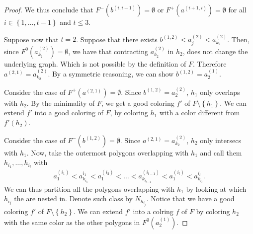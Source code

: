 \documentclass[12pt]{article}
\theoremstyle{definition}
\begin{document}
\begin{proof}
         We thus conclude that
         $F^{-}\left(b^{\left(i, i+1\right)}\right) = \emptyset$ 
         or $F^{+}\left(a^{\left(i+1, i\right)}\right) = \emptyset$
         for all
         $i \in \left\{1, \ldots, t-1\right\}$ and
         $t \leq 3$.

         Suppose now that $t = 2$.
         Suppose that there exists
         $b^{\left(1,2\right)} < 
         a_{j}^{\left(2\right)} <
         a_{k_2}^{\left(2\right)}$.
         Then, since $F^{0}\left(a_{k_2}^{\left(2\right)}\right) = 
         \emptyset$, we have that 
         contracting $a_{k_2}^{\left(2\right)}$
         in $h_2$, does not change the underlying 
         graph. Which is not possible by
         the definition of $F$.
         Therefore $a^{\left(2,1\right)} =
         a_{k_2}^{\left(2\right)}$. By a
         symmetric reasoning, we can show
         $b^{\left(1, 2\right)} = a_2^{\left(1\right)}$.
         
         Consider the case of
         $F^{+}\left(a^{\left(2, 1\right)}\right) = \emptyset$.
         Since $b^{\left(1, 2\right)} =
         a_{2}^{\left(2\right)}$, $h_1$ only
         overlaps with $h_2$.
         By the minimality of $F$, 
         we get a good coloring 
         $f'$ of $F \setminus \left\{h_1\right\}$.
         We can extend $f'$ into 
         a good coloring of $F$,
         by coloring $h_1$ with 
         a color different from
         $f'\left(h_2\right)$.

         Consider the case of
         $F^{-}\left(b^{\left(1, 2\right)}\right) = \emptyset$.
         Since $a^{\left(2, 1\right)} = 
         a_{k_2}^{\left(2\right)}$,
         $h_2$ only intersecs with $h_1$.
         Now, take the outermost polygons
         overlapping with $h_1$ and
         call them $h_{i_1}, \ldots, h_{i_{l}}$ with
         \begin{gather*}
             a_1^{\left(i_1\right)} <
             a_{k_{i_1}}^{i_1} <
             a_1^{\left(i_2\right)} < 
             \ldots <
             a_{k_{i_{l - 1}}}^{\left(i_{l - 1}\right)} <
             a_1^{\left(i_{l}\right)} <
             a_{k_{i_{l}}}^{i_{l}}.
         \end{gather*}
         We can thus partition all the
         polygons overlapping with
         $h_1$ by looking at which $h_{i_{j}}$ 
         the are nested in. Denote
         such class by $N_{h_{i_{j}}}$.
         Notice that we have a good coloring
         $f'$ of $F \setminus \left\{h_2\right\}$.
         We can extend $f'$ into a colring
         $f$ of $F$ by coloring $h_2$ with
         the same color as the other polygons in
         $F^{0}\left(a_2^{\left(1\right)}\right)$.


\end{proof}
\end{document}
